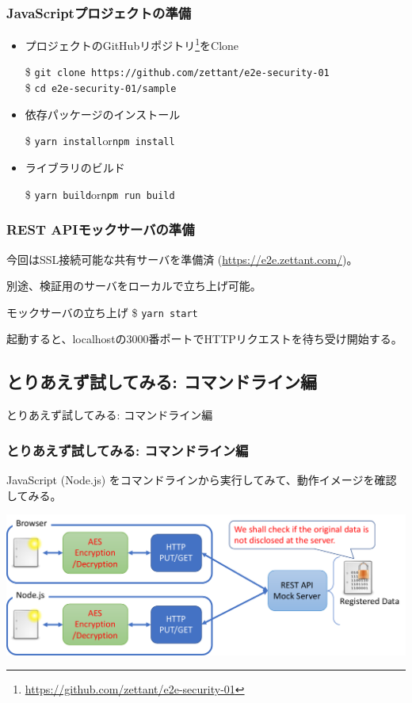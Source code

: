 \documentclass[12pt,dvipdfmx]{beamer}
\begin{document}
\begin{frame}
\frametitle{JavaScriptプロジェクトの準備}
\begin{itemize}
\item プロジェクトのGitHubリポジトリ\footnote[frame]{\url{https://github.com/zettant/e2e-security-01}}をClone\\
\begin{exampleblock}{}
\footnotesize
\$ \texttt{git clone https://github.com/zettant/e2e-security-01}\\
\$ \texttt{cd e2e-security-01/sample}
\end{exampleblock}
\item 依存パッケージのインストール
\begin{exampleblock}{}
\$ \texttt{yarn install}\quad or\quad \texttt{npm install}
\end{exampleblock}
\item ライブラリのビルド
\begin{exampleblock}{}
\$ \texttt{yarn build}\quad or\quad \texttt{npm run build}
\end{exampleblock}
\end{itemize}
\end{frame}

\begin{frame}
\frametitle{REST APIモックサーバの準備}
今回はSSL接続可能な共有サーバを準備済 (\url{https://e2e.zettant.com/})。

\vspace{2ex}

別途、検証用のサーバをローカルで立ち上げ可能。
\begin{exampleblock}{\small モックサーバの立ち上げ}
\$ \texttt{yarn start}
\end{exampleblock}
起動すると、localhostの3000番ポートでHTTPリクエストを待ち受け開始する。
\end{frame}


\subsection{とりあえず試してみる: コマンドライン編}
\begin{frame}
\centering
{\Large とりあえず試してみる: コマンドライン編}
\end{frame}

\begin{frame}
\frametitle{とりあえず試してみる: コマンドライン編}
JavaScript (Node.js) をコマンドラインから実行してみて、動作イメージを確認してみる。
\begin{center}
\includegraphics[width=\linewidth]{Figs/mock_flow.pdf}
\end{center}
\end{frame}
\end{document}
